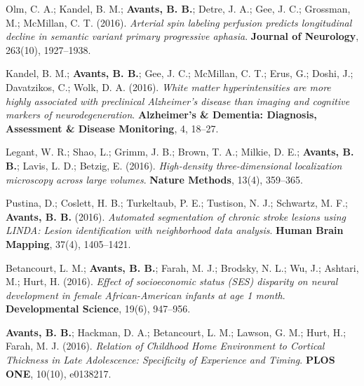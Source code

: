\documentclass[10pt,letterpaper]{article}
\begin{document}
\begin{enumerate}
{  %
  \item Olm, C. A.; Kandel, B. M.; \textbf{Avants, B. B.}; Detre, J. A.; Gee, J. C.; Grossman, M.; McMillan, C. T. (2016). \textit{Arterial spin labeling perfusion predicts longitudinal decline in semantic variant primary progressive aphasia}. \textbf{Journal of Neurology}, 263(10), 1927--1938.
  \item Kandel, B. M.; \textbf{Avants, B. B.}; Gee, J. C.; McMillan, C. T.; Erus, G.; Doshi, J.; Davatzikos, C.; Wolk, D. A. (2016). \textit{White matter hyperintensities are more highly associated with preclinical Alzheimer's disease than imaging and cognitive markers of neurodegeneration}. \textbf{Alzheimer's \& Dementia: Diagnosis, Assessment \& Disease Monitoring}, 4, 18--27.
  \item Legant, W. R.; Shao, L.; Grimm, J. B.; Brown, T. A.; Milkie, D. E.; \textbf{Avants, B. B.}; Lavis, L. D.; Betzig, E. (2016). \textit{High-density three-dimensional localization microscopy across large volumes}. \textbf{Nature Methods}, 13(4), 359--365.
  \item Pustina, D.; Coslett, H. B.; Turkeltaub, P. E.; Tustison, N. J.; Schwartz, M. F.; \textbf{Avants, B. B.} (2016). \textit{Automated segmentation of chronic stroke lesions using LINDA: Lesion identification with neighborhood data analysis}. \textbf{Human Brain Mapping}, 37(4), 1405--1421.
  \item Betancourt, L. M.; \textbf{Avants, B. B.}; Farah, M. J.; Brodsky, N. L.; Wu, J.; Ashtari, M.; Hurt, H. (2016). \textit{Effect of socioeconomic status (SES) disparity on neural development in female African-American infants at age 1 month}. \textbf{Developmental Science}, 19(6), 947--956.
  \item \textbf{Avants, B. B.}; Hackman, D. A.; Betancourt, L. M.; Lawson, G. M.; Hurt, H.; Farah, M. J. (2016). \textit{Relation of Childhood Home Environment to Cortical Thickness in Late Adolescence: Specificity of Experience and Timing}. \textbf{PLOS ONE}, 10(10), e0138217.

}
\end{enumerate}
\end{document}
